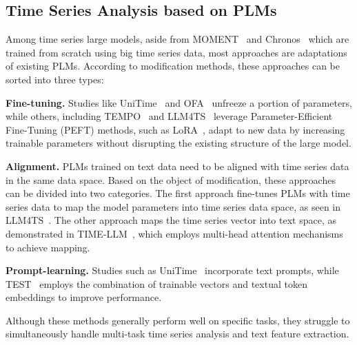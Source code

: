 \subsection{Time Series Analysis based on PLMs} 

Among time series large models, aside from MOMENT~\cite{DBLP:conf/icml/GoswamiSCCLD24} and Chronos~\cite{Ansari_Chronos_2024} which are trained from scratch using big time series data, most approaches are adaptations of existing PLMs. According to modification methods, these approaches can be sorted into three types:

\textbf{Fine-tuning.} Studies like UniTime~\cite{DBLP:conf/www/LiuHLDLHZ24} and OFA~\cite{zhou2023one} unfreeze a portion of parameters, while others, including TEMPO~\cite{DBLP:conf/iclr/CaoJAPZY024} and LLM4TS~\cite{Chang_LLM4TS_2024} leverage Parameter-Efficient Fine-Tuning (PEFT) methods, such as LoRA~\cite{DBLP:conf/iclr/HuSWALWWC22}, adapt to new data by increasing trainable parameters without disrupting the existing structure of the large model. 


\textbf{Alignment.} PLMs trained on text data need to be aligned with time series data in the same data space. Based on the object of modification, these approaches can be divided into two categories. The first approach fine-tunes PLMs with time series data to map the model parameters into time series data space, as seen in LLM4TS~\cite{Chang_LLM4TS_2024}. The other approach maps the time series vector into text space, as demonstrated in TIME-LLM~\cite{DBLP:conf/iclr/0005WMCZSCLLPW24}, which employs multi-head attention mechanisms to achieve mapping.

\textbf{Prompt-learning.} Studies such as UniTime~\cite{DBLP:conf/www/LiuHLDLHZ24} incorporate text prompts, while TEST~\cite{DBLP:conf/iclr/Sun0LH24} employs the combination of trainable vectors and textual token embeddings to improve performance.



Although these methods generally perform well on specific tasks, they struggle to simultaneously handle multi-task time series analysis and text feature extraction.